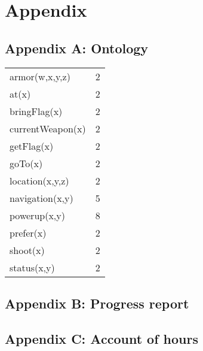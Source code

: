 \part{Appendix}
%

\chapter*{Appendix A: Ontology}
\begin{tabular}{ l | r }
  armor(w,x,y,z) & 2 \\
  at(x) & 2 \\
  bringFlag(x) & 2 \\
  currentWeapon(x) & 2 \\
  getFlag(x) & 2 \\
  goTo(x) & 2 \\
  location(x,y,z) & 2 \\
  navigation(x,y) & 5 \\
  powerup(x,y) & 8 \\
  prefer(x) & 2 \\
  shoot(x) & 2 \\
  status(x,y) & 2 \\
\end{tabular}
	
	
\chapter*{Appendix B: Progress report}
	
	
\chapter*{Appendix C: Account of hours}
	